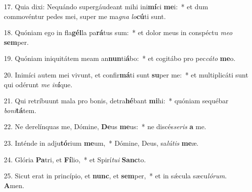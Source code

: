 17. Quia dixi: Nequándo supergáudeant mihi ini\textbf{mí}ci \textbf{me}i:~*  et dum commovéntur pedes mei, super me ma\textit{gna} \textit{lo}\textbf{cú}ti sunt.\

18. Quóniam ego in fla\textbf{gél}la pa\textbf{rá}tus sum:~*  et dolor meus in conspéctu \textit{me}\textit{o} \textbf{sem}per.\

19. Quóniam iniquitátem meam an\textbf{nun}ti\textbf{á}bo:~*  et cogitábo pro pec\textit{cá}\textit{to} \textbf{me}o.\

20. Inimíci autem mei vivunt, et confir\textbf{má}ti sunt \textbf{su}per me:~*  et multiplicáti sunt qui odérunt \textit{me} \textit{in}\textbf{í}que.\

21. Qui retríbuunt mala pro bonis, detra\textbf{hé}bant \textbf{mi}hi:~*  quóniam sequébar \textit{bo}\textit{ni}\textbf{tá}tem.\

22. Ne derelínquas me, Dómine, \textbf{De}us \textbf{me}us:~*  ne discés\textit{se}\textit{ris} \textbf{a} me.\

23. Inténde in adju\textbf{tó}rium \textbf{me}um,~*  Dómine, Deus, sa\textit{lú}\textit{tis} \textbf{me}æ.\

24. Glória \textbf{Pa}tri, et \textbf{Fí}lio,~*  et Spirí\textit{tu}\textit{i} \textbf{Sanc}to.\

25. Sicut erat in princípio, et \textbf{nunc}, et \textbf{sem}per,~*  et in sǽcula sæcu\textit{ló}\textit{rum}. \textbf{A}men.\

